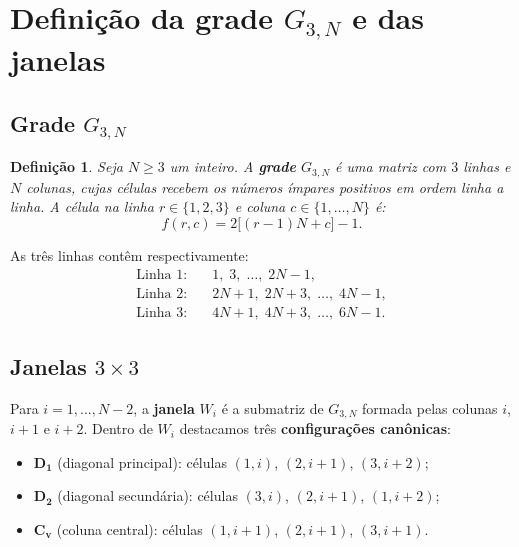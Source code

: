 \documentclass[12pt, a4paper]{article}
\newtheorem{definicao}[lema]{Definição}
\begin{document}
	\section{Definição da grade $G_{3,N}$ e das janelas}
	\label{sec:definicao}
	
	\subsection{Grade $G_{3,N}$}
	
	\begin{definicao}
		Seja $N\ge 3$ um inteiro. A \textbf{grade} $G_{3,N}$ é uma matriz com $3$ linhas e
		$N$ colunas, cujas células recebem os números ímpares positivos em ordem linha a
		linha. A célula na linha $r\in\{1,2,3\}$ e coluna $c\in\{1,\dots,N\}$ é:
		\[
		f(r,c) = 2\bigl[(r-1)N + c\bigr] - 1.
		\]
	\end{definicao}
	
	As três linhas contêm respectivamente:
	\begin{align*}
		\text{Linha 1:}&\quad 1,\;3,\;\dots,\;2N-1,\\
		\text{Linha 2:}&\quad 2N+1,\;2N+3,\;\dots,\;4N-1,\\
		\text{Linha 3:}&\quad 4N+1,\;4N+3,\;\dots,\;6N-1.
	\end{align*}
	
	\subsection{Janelas $3\times 3$}
	
	Para $i=1,\dots,N-2$, a \textbf{janela} $W_i$ é a submatriz de $G_{3,N}$ formada
	pelas colunas $i$, $i+1$ e $i+2$. Dentro de $W_i$ destacamos três
	\textbf{configurações canônicas}:
	\begin{itemize}
		\item $\mathbf{D_1}$ (diagonal principal): células $(1,i)$, $(2,i+1)$, $(3,i+2)$;
		\item $\mathbf{D_2}$ (diagonal secundária): células $(3,i)$, $(2,i+1)$, $(1,i+2)$;
		\item $\mathbf{C_v}$ (coluna central): células $(1,i+1)$, $(2,i+1)$, $(3,i+1)$.
	\end{itemize}
	
\end{document}
